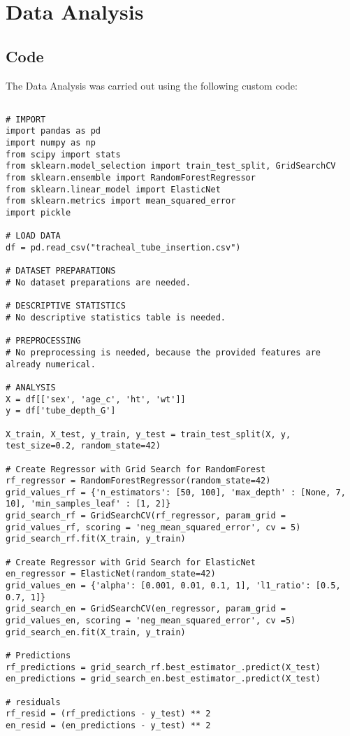 \documentclass[11pt]{article}
\begin{document}
\section{Data Analysis}
\subsection{{Code}}
The Data Analysis was carried out using the following custom code:

\begin{verbatim}

# IMPORT
import pandas as pd
import numpy as np
from scipy import stats
from sklearn.model_selection import train_test_split, GridSearchCV
from sklearn.ensemble import RandomForestRegressor
from sklearn.linear_model import ElasticNet
from sklearn.metrics import mean_squared_error
import pickle

# LOAD DATA
df = pd.read_csv("tracheal_tube_insertion.csv")

# DATASET PREPARATIONS
# No dataset preparations are needed.

# DESCRIPTIVE STATISTICS
# No descriptive statistics table is needed.

# PREPROCESSING 
# No preprocessing is needed, because the provided features are already numerical.

# ANALYSIS
X = df[['sex', 'age_c', 'ht', 'wt']]
y = df['tube_depth_G']

X_train, X_test, y_train, y_test = train_test_split(X, y, test_size=0.2, random_state=42)

# Create Regressor with Grid Search for RandomForest
rf_regressor = RandomForestRegressor(random_state=42)
grid_values_rf = {'n_estimators': [50, 100], 'max_depth' : [None, 7, 10], 'min_samples_leaf' : [1, 2]}
grid_search_rf = GridSearchCV(rf_regressor, param_grid = grid_values_rf, scoring = 'neg_mean_squared_error', cv = 5)
grid_search_rf.fit(X_train, y_train)

# Create Regressor with Grid Search for ElasticNet
en_regressor = ElasticNet(random_state=42)
grid_values_en = {'alpha': [0.001, 0.01, 0.1, 1], 'l1_ratio': [0.5, 0.7, 1]}
grid_search_en = GridSearchCV(en_regressor, param_grid = grid_values_en, scoring = 'neg_mean_squared_error', cv =5)
grid_search_en.fit(X_train, y_train)

# Predictions
rf_predictions = grid_search_rf.best_estimator_.predict(X_test)
en_predictions = grid_search_en.best_estimator_.predict(X_test)

# residuals
rf_resid = (rf_predictions - y_test) ** 2
en_resid = (en_predictions - y_test) ** 2


\end{verbatim}
\end{document}
